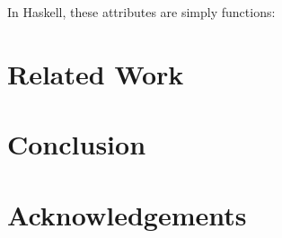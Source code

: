 \documentclass[runningheads]{llncs}
\begin{document}
  In Haskell, these attributes are simply functions:

\section{Related Work}\label{sec:related-work}

\section{Conclusion}\label{sec:conclusion}

\section*{Acknowledgements}



\end{document}
